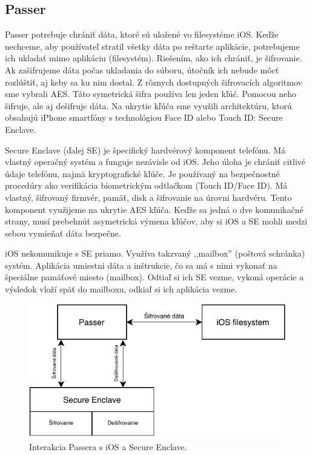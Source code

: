 \subsection{Passer}
Passer potrebuje chrániť dáta, ktoré sú uložené vo filesystéme iOS. Keďže nechceme, aby používateľ stratil všetky dáta po reštarte aplikácie, potrebujeme ich ukladať mimo aplikáciu (filesystém). Riešením, ako ich chrániť, je šifrovanie. Ak zašifrujeme dáta počas ukladania do súboru, útočník ich nebude môcť rozlúštiť, aj keby sa ku nim dostal. 
Z rôznych dostupných šifrovacích algoritmov sme vybrali 
AES. Táto symetrická šifra používa len jeden kľúč. Pomocou neho šifruje, ale aj dešifruje dáta. Na ukrytie kľúča sme využili architektúru, ktorú obsahujú iPhone smartfóny s technológiou Face ID alebo Touch ID: Secure Enclave.

Secure Enclave (ďalej SE) je špecifický hardvérový komponent telefónu. Má vlastný operačný systém a funguje nezávisle od iOS. Jeho úloha je chrániť citlivé údaje telefónu, najmä kryptografické kľúče. Je používaný na bezpečnostné procedúry ako verifikácia biometrickým odtlačkom \cite{secureenclave} (Touch ID/Face ID). Má vlastný, šifrovaný firmvér, pamäť, disk a šifrovanie na úrovni hardvéru. Tento komponent využijeme na ukrytie AES kľúča. Keďže sa jedná o dve komunikačné strany, musí prebehnúť asymetrická výmena kľúčov, aby si iOS a SE mohli medzi sebou vymieňať dáta bezpečne. 

iOS nekomunikuje s SE priamo. Využíva takzvaný ,,mailbox'' (poštová schránka) systém. Aplikácia umiestni dáta a inštrukcie, čo sa má s nimi vykonať na špeciálne pamäťové miesto (mailbox). Odtiaľ si ich SE vezme, vykoná operácie a výsledok vloží späť do mailboxu, odkiaľ si ich aplikácia vezme. 
\newline
\begin{figure}[H]
  \centering
  \includegraphics[width=15cm]{img/enclave.pdf}
  \caption{Interakcia Passera s iOS a Secure Enclave.}
  \label{enclave}
\end{figure}

